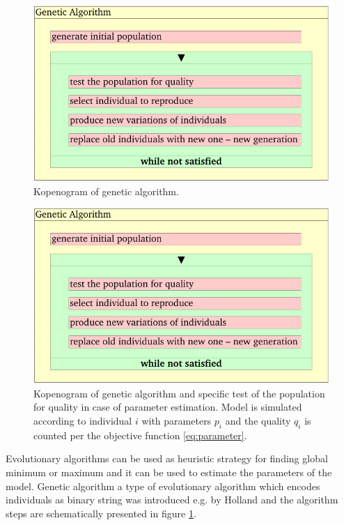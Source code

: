 \begin{figure}[htb]
    \centering
    \includegraphics[page=1]{chapter3/GA-kopenogram-crop.pdf}    
    \caption{Kopenogram of genetic algorithm. 
    }
    \label{fig:GA-kopenogram}
\end{figure}
\begin{figure}[htb]
    \centering
    \includegraphics[page=2]{chapter3/GA-kopenogram-crop.pdf}    
    \caption{Kopenogram of genetic algorithm and specific test of the population for quality in case of parameter estimation. Model is simulated according to individual $i$ with parameters $p_i$ and the quality $q_i$ is counted per the objective function \ref{eq:parameter}.
    }
    \label{fig:GA-kopenogram2}
\end{figure}
Evolutionary algorithms can be used as heuristic strategy for finding global minimum or maximum and it can be used to estimate the parameters of the model. Genetic algorithm a type of evolutionary algorithm which encodes individuals as binary string was introduced e.g. by Holland\cite{Holland1975} and the algorithm steps are schematically presented in figure \ref{fig:GA-kopenogram}.

